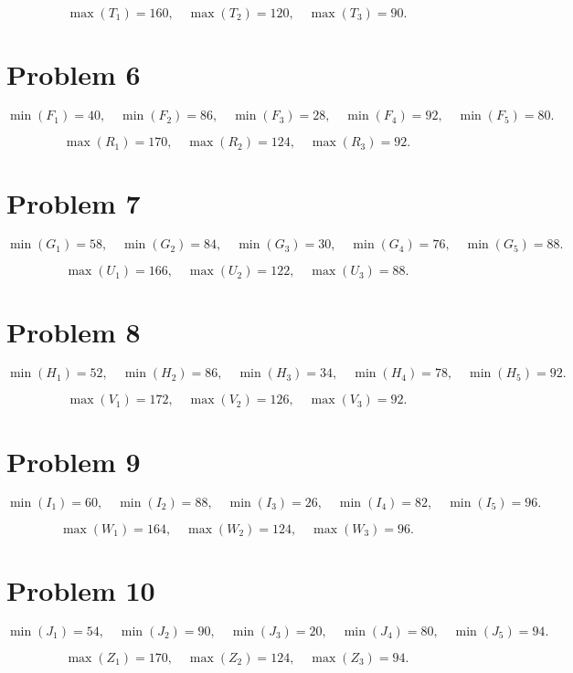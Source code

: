 \[\max(T_1)=160,\quad \max(T_2)=120,\quad \max(T_3)=90.\]

\section*{Problem 6}
\[\min(F_1)=40,\quad \min(F_2)=86,\quad \min(F_3)=28,\quad \min(F_4)=92,\quad \min(F_5)=80.\]

\[\max(R_1)=170,\quad \max(R_2)=124,\quad \max(R_3)=92.\]

\section*{Problem 7}
\[\min(G_1)=58,\quad \min(G_2)=84,\quad \min(G_3)=30,\quad \min(G_4)=76,\quad \min(G_5)=88.\]

\[\max(U_1)=166,\quad \max(U_2)=122,\quad \max(U_3)=88.\]

\section*{Problem 8}
\[\min(H_1)=52,\quad \min(H_2)=86,\quad \min(H_3)=34,\quad \min(H_4)=78,\quad \min(H_5)=92.\]

\[\max(V_1)=172,\quad \max(V_2)=126,\quad \max(V_3)=92.\]

\section*{Problem 9}
\[\min(I_1)=60,\quad \min(I_2)=88,\quad \min(I_3)=26,\quad \min(I_4)=82,\quad \min(I_5)=96.\]

\[\max(W_1)=164,\quad \max(W_2)=124,\quad \max(W_3)=96.\]

\section*{Problem 10}
\[\min(J_1)=54,\quad \min(J_2)=90,\quad \min(J_3)=20,\quad \min(J_4)=80,\quad \min(J_5)=94.\]

\[\max(Z_1)=170,\quad \max(Z_2)=124,\quad \max(Z_3)=94.\]


